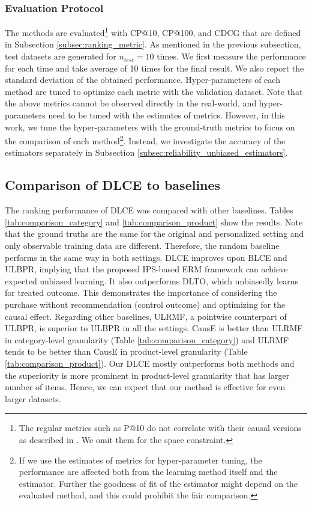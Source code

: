 \documentclass[manuscript,screen]{acmart}
\begin{document}
\subsubsection{Evaluation Protocol}
The methods are evaluated\footnote{The regular metrics such as P@10 do not correlate with their causal versions as described in \cite{Sato19}. We omit them for the space constraint.} with CP@10, CP@100, and CDCG that are defined in Subsection \ref{subsec:ranking_metric}.
As mentioned in the previous subsection, test datasets are generated for $n_{test}=10$ times.
We first measure the performance for each time and take average of 10 times for the final result.
We also report the standard deviation of the obtained performance.
Hyper-parameters of each method are tuned to optimize each metric with the validation dataset.
Note that the above metrics cannot be observed directly in the real-world, and hyper-parameters need to be tuned with the estimates of metrics.
However, in this work, we tune the hyper-parameters with the ground-truth metrics to focus on the comparison of each method\footnote{If we use the estimates of metrics for hyper-parameter tuning, the performance are affected both from the learning method itself and the estimator. Further the goodness of fit of the estimator might depend on the evaluated method, and this could prohibit the fair comparison.}.
Instead, we investigate the accuracy of the estimators separately in Subsection \ref{subsec:reliability_unbiased_estimators}.

\subsection{Comparison of DLCE to baselines}
The ranking performance of DLCE was compared with other baselines.
Tables \ref{tab:comparison_category} and \ref{tab:comparison_product} show the results.
Note that the ground truths are the same for the original and personalized setting and only observable training data are different.
Therefore, the random baseline performs in the same way in both settings.
DLCE improves upon BLCE and ULBPR, implying that the proposed IPS-based ERM framework can achieve expected unbiased learning.
It also outperforms DLTO, which unbiasedly learns for treated outcome.
This demonstrates the importance of considering the purchase without recommendation (control outcome) and optimizing for the causal effect.
Regarding other baselines, ULRMF, a pointwise counterpart of ULBPR, is superior to ULBPR in all the settings. 
CausE is better than ULRMF in category-level granularity (Table \ref{tab:comparison_category}) and ULRMF tends to be better than CausE in product-level granularity (Table \ref{tab:comparison_product}).
Our DLCE mostly outperforms both methods and the superiority is more prominent in product-level granularity that has larger number of items.
Hence, we can expect that our method is effective for even larger datasets.
\end{document}
